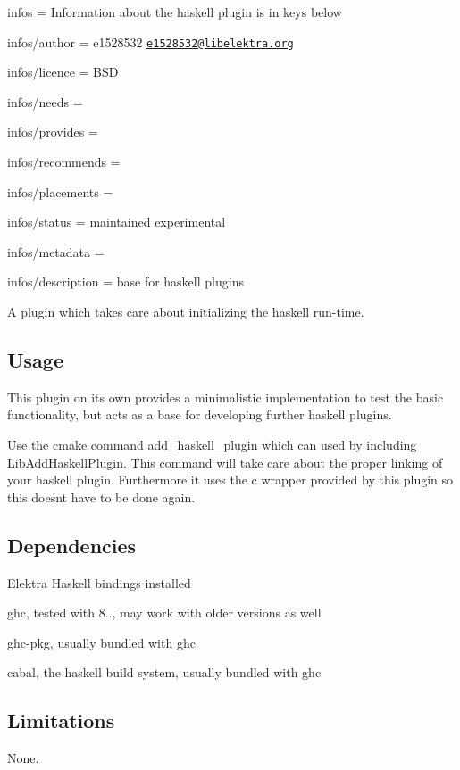 
\begin{DoxyItemize}
\item infos = Information about the haskell plugin is in keys below
\item infos/author = e1528532 \href{mailto:e1528532@libelektra.org}{\tt e1528532@libelektra.\+org}
\item infos/licence = B\+SD
\item infos/needs =
\item infos/provides =
\item infos/recommends =
\item infos/placements =
\item infos/status = maintained experimental
\item infos/metadata =
\item infos/description = base for haskell plugins
\end{DoxyItemize}

A plugin which takes care about initializing the haskell run-\/time.

\subsection*{Usage}

This plugin on its own provides a minimalistic implementation to test the basic functionality, but acts as a base for developing further haskell plugins.

Use the cmake command add\+\_\+haskell\+\_\+plugin which can used by including Lib\+Add\+Haskell\+Plugin. This command will take care about the proper linking of your haskell plugin. Furthermore it uses the c wrapper provided by this plugin so this doesn\textquotesingle{}t have to be done again.

\subsection*{Dependencies}


\begin{DoxyItemize}
\item Elektra Haskell bindings installed
\item ghc, tested with 8.., may work with older versions as well
\item ghc-\/pkg, usually bundled with ghc
\item cabal, the haskell build system, usually bundled with ghc
\end{DoxyItemize}

\subsection*{Limitations}

None. 